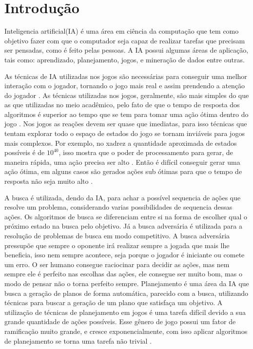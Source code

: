 \chapter{\label{chap:intro}Introdução}

Inteligencia artificial(IA) é uma área em ciência da computação que tem como objetivo fazer com que o computador seja capaz de realizar tarefas que precisam ser pensadas, como é feito pelas pessoas.  
A IA possui algumas áreas de aplicação, tais como: aprendizado, planejamento, jogos, e mineração de dados entre outras. 

As técnicas de IA utilizadas nos jogos são necessárias para conseguir uma melhor interação com o jogador, tornando o jogo mais real e assim prendendo a atenção do jogador \cite{millington2009artificial}. 
As técnicas utilizadas nos jogos, geralmente, são mais simples do que as que utilizadas no meio acadêmico, pelo fato de que o tempo de resposta dos algoritmos é superior ao tempo que se tem para tomar uma ação ótima dentro do jogo \cite{intelligence2003modern}. 
Nos jogos as reações devem ser quase que imediatas, para isso técnicas que tentam explorar todo o espaço de estados do jogo se tornam inviáveis para jogos mais complexos.
Por exemplo, no xadrez a quantidade aproximada de estados possíveis é de $10^{40}$, isso mostra que o poder de processamento para gerar, de maneira rápida, uma ação precisa ser alto \cite{millington2009artificial}. Então é difícil conseguir gerar uma ação ótima, em alguns casos são gerados ações sub ótimas para que o tempo de resposta não seja muito alto \cite{intelligence2003modern}. 


A busca é utilizada, dendo da IA, para achar a possível sequencia de ações que resolve um problema, considerando varias possibilidades de sequencia dessas ações. Os algoritmos de busca se diferenciam entre si na forma de escolher qual o próximo estado na busca pelo objetivo. Já a busca adversária é utilizada para a resolução de problemas de busca em modo competitivo. A busca adversária pressupõe que sempre o oponente irá realizar sempre a jogada que mais lhe beneficia, isso nem sempre acontece, seja porque o jogador é iniciante ou comete um erro. O ser humano consegue raciocinar para decidir as ações, mas nem sempre ele é perfeito nas escolhas das ações, ele consegue ser muito bom, mas o modo de pensar não o torna perfeito sempre. Planejamento é uma área da IA que busca a geração de planos de forma automática, parecido com a busca, utilizando técnicas para buscar a geração de um plano que satisfaça um objetivo. A utilização de técnicas de planejamento em jogos é uma tarefa difícil devido a sua grande quantidade de ações possíveis. Esse gênero de jogo possui um fator de ramificação muito grande, e cresce exponencialmente, com isso aplicar algoritmos de planejamento se torna uma tarefa não trivial \cite{intelligence2003modern}. 


